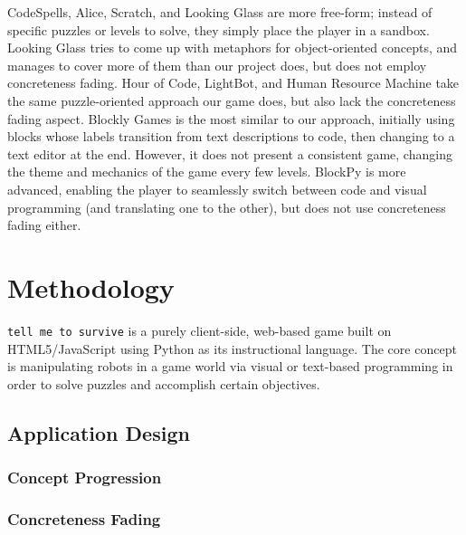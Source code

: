 \documentclass[12pt,notitlepage]{article}
\newcommand\tmts[0]{\texttt{tell me to survive}}
\begin{document}
CodeSpells, Alice, Scratch, and Looking Glass are more free-form;
instead of specific puzzles or levels to solve, they simply place the
player in a sandbox. Looking Glass tries to come up with metaphors for
object-oriented concepts, and manages to cover more of them than our
project does, but does not employ concreteness fading. Hour of Code,
LightBot, and Human Resource Machine take the same puzzle-oriented
approach our game does, but also lack the concreteness fading
aspect. Blockly Games is the most similar to our approach, initially
using blocks whose labels transition from text descriptions to code,
then changing to a text editor at the end. However, it does not
present a consistent game, changing the theme and mechanics of the
game every few levels. BlockPy is more advanced, enabling the player
to seamlessly switch between code and visual programming (and
translating one to the other), but does not use concreteness fading
either.

\section{Methodology}

\tmts{} is a purely client-side, web-based game built on
HTML5/JavaScript using Python as its instructional language. The core
concept is manipulating robots in a game world via visual or
text-based programming in order to solve puzzles and accomplish
certain objectives.

\subsection{Application Design}

\subsubsection{Concept Progression}

\subsubsection{Concreteness Fading}

\begin{figure}
  \captionsetup{justification=centering}
\end{figure}
\end{document}

